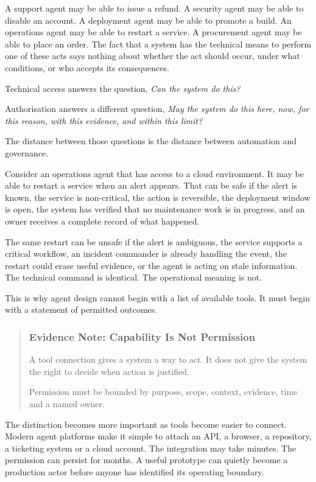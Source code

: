 A support agent may be able to issue a refund. A security agent may be
able to disable an account. A deployment agent may be able to promote a
build. An operations agent may be able to restart a service. A
procurement agent may be able to place an order. The fact that a system
has the technical means to perform one of these acts says nothing about
whether the act should occur, under what conditions, or who accepts its
consequences.

Technical access answers the question, \emph{Can the system do this?}

Authorisation answers a different question, \emph{May the system do this
here, now, for this reason, with this evidence, and within this limit?}

The distance between those questions is the distance between automation
and governance.

Consider an operations agent that has access to a cloud environment. It
may be able to restart a service when an alert appears. That can be safe
if the alert is known, the service is non-critical, the action is
reversible, the deployment window is open, the system has verified that
no maintenance work is in progress, and an owner receives a complete
record of what happened.

The same restart can be unsafe if the alert is ambiguous, the service
supports a critical workflow, an incident commander is already handling
the event, the restart could erase useful evidence, or the agent is
acting on stale information. The technical command is identical. The
operational meaning is not.

This is why agent design cannot begin with a list of available tools. It
must begin with a statement of permitted outcomes.

\begin{quote}
\subsubsection{Evidence Note: Capability Is Not
Permission}\label{evidence-note-capability-is-not-permission}

A tool connection gives a system a way to act. It does not give the
system the right to decide when action is justified.

Permission must be bounded by purpose, scope, context, evidence, time
and a named owner.
\end{quote}

The distinction becomes more important as tools become easier to
connect. Modern agent platforms make it simple to attach an API, a
browser, a repository, a ticketing system or a cloud account. The
integration may take minutes. The permission can persist for months. A
useful prototype can quietly become a production actor before anyone has
identified its operating boundary.

